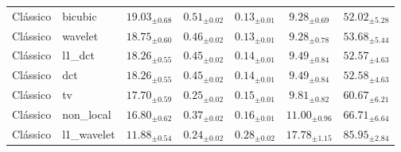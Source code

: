 \begin{table}[htbp]
{\begin{tabular}{llccccc}
Clássico & bicubic & $19.03_{\pm 0.68}$ & $0.51_{\pm 0.02}$ & $0.13_{\pm 0.01}$ & $9.28_{\pm 0.69}$ & $52.02_{\pm 5.28}$ \\
Clássico & wavelet & $18.75_{\pm 0.60}$ & $0.46_{\pm 0.02}$ & $0.13_{\pm 0.01}$ & $9.28_{\pm 0.78}$ & $53.68_{\pm 5.44}$ \\
Clássico & l1\_dct & $18.26_{\pm 0.55}$ & $0.45_{\pm 0.02}$ & $0.14_{\pm 0.01}$ & $9.49_{\pm 0.84}$ & $52.57_{\pm 4.63}$ \\
Clássico & dct & $18.26_{\pm 0.55}$ & $0.45_{\pm 0.02}$ & $0.14_{\pm 0.01}$ & $9.49_{\pm 0.84}$ & $52.58_{\pm 4.63}$ \\
Clássico & tv & $17.70_{\pm 0.59}$ & $0.25_{\pm 0.02}$ & $0.15_{\pm 0.01}$ & $9.81_{\pm 0.82}$ & $60.67_{\pm 6.21}$ \\
Clássico & non\_local & $16.80_{\pm 0.62}$ & $0.37_{\pm 0.02}$ & $0.16_{\pm 0.01}$ & $11.00_{\pm 0.96}$ & $66.71_{\pm 6.64}$ \\
Clássico & l1\_wavelet & $11.88_{\pm 0.54}$ & $0.24_{\pm 0.02}$ & $0.28_{\pm 0.02}$ & $17.78_{\pm 1.15}$ & $85.95_{\pm 2.84}$ \\
\bottomrule
\end{tabular}
}
\end{table}
